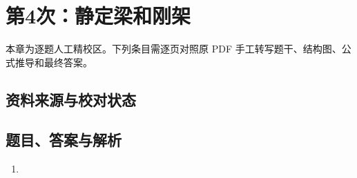 \chapter{第4次：静定梁和刚架}

本章为逐题人工精校区。下列条目需逐页对照原 PDF 手工转写题干、结构图、公式推导和最终答案。

\section{资料来源与校对状态}


\section{题目、答案与解析}

\begin{enumerate}[label=\textbf{第\arabic*题},wide]
  \item
  \begin{problemBox}
  \end{problemBox}

  \begin{solutionBox}
  \end{solutionBox}
\end{enumerate}

